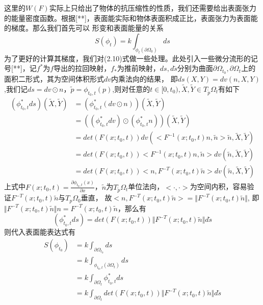这里的$W(F)$实际上只给出了物体的抗压缩性的性质，我们还需要给出表面张力的能量密度函数。根据[**]，表面能实际和物体表面积成正比，表面张力为表面能的梯度。那么我们首先可以
形变和表面能量的关系
\begin{equation}
    S(\phi_t) = k\int_{\phi_t (\partial \Omega_0)} ds
\end{equation}
为了更好的计算其梯度，我们对(2.10)式做一些处理。此处引入一些微分流形的记号[**]，记$f^*$为$f$导出的拉回映射，$f_*$为推前映射，$ds,d\tilde{s}$分别为曲面$\partial \Omega_{t_0}, \partial \Omega_{t}$上的面积二形式，其为空间体积形式$dv$内乘法向的结果，
即$ds(X,Y) = dv(n,X,Y)$,我们记$ds = dv\odot n$，$ \tilde{p} = \phi_{t_0,t}(p)$,则对任意的$t \in[0, t_0),\tilde{X},\tilde{Y}\in T_{\tilde{p}}\Omega_t$有如下
\begin{equation}
    \begin{split}
        (\phi_{t_0,t}^*ds) (\tilde{X},\tilde{Y})& = (\phi_{t_0,t}^* (dv \odot n))(\tilde{X},\tilde{Y})\\
        &= ((\phi_{t_0,t}^* dv)\odot(\phi_{t_0,t}^* n))(\tilde{X},\tilde{Y})\\
        &= det(F(x;t_0,t))dv (<F^{-1}(x;t_0,t)n,\tilde{n}>\tilde{n} ,\tilde{X},\tilde{Y})\\
        &= det(F(x;t_0,t))<F^{-1}(x;t_0,t)n,\tilde{n}> dv(\tilde{n} ,\tilde{X},\tilde{Y})\\
        &= det(F(x;t_0,t))<n,F^{-T}(x;t_0,t)\tilde{n}>dv(\tilde{n} ,\tilde{X},\tilde{Y})
    \end{split}
\end{equation}
上式中$F(x;t_0,t) = \frac{\partial \phi_{t_0,t}(x)}{\partial x}$，$\tilde{n}$为$T_{\tilde{p}}\Omega_t$单位法向，$<\cdot,\cdot>$为空间内积，容易验证$F^{-T}(x;t_0,t)\tilde{n}$与$T_p\Omega_0$垂直，
故$<n,F^{-T}(x;t_0,t)\tilde{n}> = \Vert F^{-T}(x;t_0,t)\tilde{n}\Vert$, 即$\Vert F^{-T}(x;t_0,t)\tilde{n}\Vert n = F^{-T}(x;t_0,t)\tilde{n}$，那么有
$$(\phi_{t_0,t}^*ds) = det(F(x;t_0,t)) \Vert F^{-T}(x;t_0,t)\tilde{n}\Vert d\tilde{s}$$
则代入表面能表达式有
\begin{equation}
    \begin{split}
        S(\phi_{t_0}) &= k  \int_{\partial\Omega_{t_0}}ds\\
        &= k \int_{\phi_{t_0,t}(\partial\Omega_{t})} ds\\
        &= k \int_{\partial \Omega_t}  \phi_{t_0,t}^* ds\\
        &= k \int_{\partial \Omega_t} det(F(x;t_0,t)) \Vert F^{-T}(x;t_0,t)\tilde{n}\Vert d\tilde{s}\nonumber\\
    \end{split}
\end{equation}

